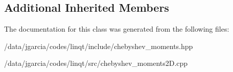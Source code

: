 \subsection*{Additional Inherited Members}


The documentation for this class was generated from the following files\+:\begin{DoxyCompactItemize}
\item 
/data/jgarcia/codes/linqt/include/chebyshev\+\_\+moments.\+hpp\item 
/data/jgarcia/codes/linqt/src/chebyshev\+\_\+moments2\+D.\+cpp\end{DoxyCompactItemize}
